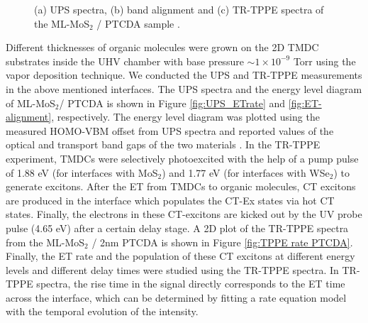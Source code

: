 \documentclass[12pt]{article}
\begin{document}
\begin{figure}[H]
\caption{(a) UPS spectra, (b) band alignment and (c) TR-TPPE spectra of the ML-MoS$_2$ / PTCDA sample \cite{rijal2020collective}.}\label{fig:ET UPS TPPE}
\end{figure}

Different thicknesses of organic molecules were grown on the 2D TMDC substrates inside the UHV chamber with base pressure $\sim 1 \times 10^{-9}$ Torr using the vapor deposition technique. We conducted the UPS and TR-TPPE measurements in the above mentioned interfaces. The UPS spectra and the energy level diagram of ML-MoS$_2$/ PTCDA  is shown in Figure \ref{fig:UPS_ETrate} and \ref{fig:ET-alignment}, respectively. The energy level diagram was plotted using the measured HOMO-VBM offset from UPS spectra and reported values of the optical and transport band gaps of the two materials \cite{martinez2014imaging,forker2009optical,park2018direct}. In the TR-TPPE experiment, TMDCs were selectively photoexcited with the help of a pump pulse of 1.88 eV (for interfaces with MoS$_2$) and 1.77 eV (for interfaces with WSe$_2$) to generate excitons. After the ET from TMDCs to organic molecules, CT excitons are produced in the interface which populates the CT-Ex states via hot CT states. Finally, the electrons in these CT-excitons are kicked out by the UV probe pulse (4.65 eV) after a certain delay stage. A 2D plot of the TR-TPPE spectra from the ML-MoS$_2$ / 2nm PTCDA is shown in Figure \ref{fig:TPPE rate PTCDA}. Finally, the ET rate and the population of these CT excitons at different energy levels and different delay times were studied using the TR-TPPE spectra. In TR-TPPE spectra, the rise time in the signal directly corresponds to the ET time across the interface, which can be determined by fitting a rate equation model with the temporal evolution of the intensity.
\end{document}
